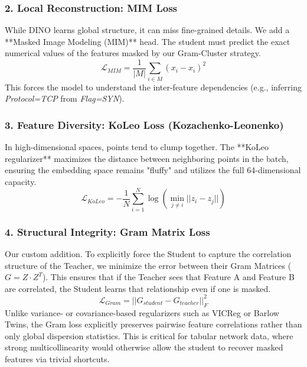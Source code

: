 \documentclass[
  10pt,
  twocolumn,
  a4paper,
  parskip=half
]{scrartcl}
\begin{document}
    \subsubsection{2. Local Reconstruction: MIM Loss}
    While DINO learns global structure, it can miss fine-grained details. We add a **Masked Image Modeling (MIM)** head. The student must predict the exact numerical values of the features masked by our Gram-Cluster strategy.
    \begin{equation}
        \mathcal{L}_{MIM} = \frac{1}{|M|} \sum_{i \in M} (x_i - \hat{x}_i)^2
    \end{equation}
    This forces the model to understand the inter-feature dependencies (e.g., inferring \textit{Protocol=TCP} from \textit{Flag=SYN}).

    \subsubsection{3. Feature Diversity: KoLeo Loss (Kozachenko-Leonenko)}
    In high-dimensional spaces, points tend to clump together. The **KoLeo regularizer** maximizes the distance between neighboring points in the batch, ensuring the embedding space remains "fluffy" and utilizes the full 64-dimensional capacity.
    \begin{equation}
        \mathcal{L}_{KoLeo} = - \frac{1}{N} \sum_{i=1}^{N} \log (\min_{j \neq i} ||z_i - z_j||)
    \end{equation}

    \subsubsection{4. Structural Integrity: Gram Matrix Loss}
    Our custom addition. To explicitly force the Student to capture the correlation structure of the Teacher, we minimize the error between their Gram Matrices ($G = Z \cdot Z^T$). This ensures that if the Teacher sees that Feature A and Feature B are correlated, the Student learns that relationship even if one is masked.
    \begin{equation}
        \mathcal{L}_{Gram} = || G_{student} - G_{teacher} ||_F^2
    \end{equation}
    Unlike variance- or covariance-based regularizers such as VICReg or Barlow Twins, the Gram loss explicitly preserves pairwise feature correlations rather than only global dispersion statistics. This is critical for tabular network data, where strong multicollinearity would otherwise allow the student to recover masked features via trivial shortcuts.
\end{document}
